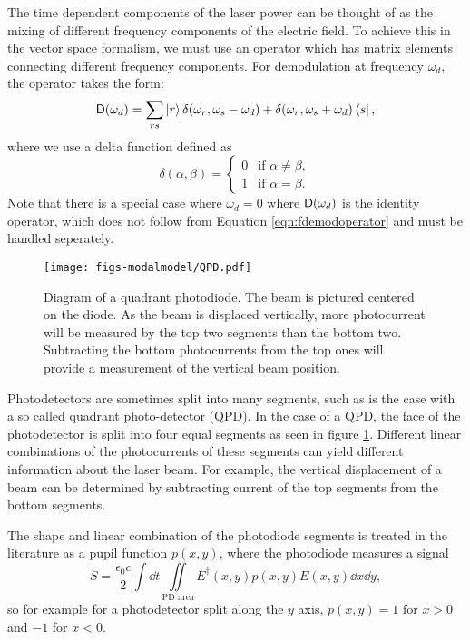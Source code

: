 The time dependent components of the laser power can be thought of as the mixing of different frequency components of the electric field. %
To achieve this in the vector space formalism, we must use an operator which has matrix elements connecting different frequency components. %
For demodulation at frequency $\omega_d$, the  operator takes the form: 
\begin{equation}
\label{eqn:fdemodoperator}
\mathsf{D}(\omega_d) = \sum_{rs} \left| r \right> \delta(\omega_r,\omega_s-\omega_d) + \delta(\omega_r,\omega_s+\omega_d)\left< s \right|,
\end{equation}
where we use a delta function defined as
\begin{equation}
\delta(\alpha,\beta) = 
\begin{cases}
0 & \text{if $\alpha \neq \beta$}, \\
1 & \text{if $\alpha = \beta$}.
\end{cases}
\end{equation}
Note that there is a special case where $\omega_d=0$ where $\mathsf{D}(\omega_d)$ is the identity operator, which does not follow from Equation \ref{eqn:fdemodoperator} and must be handled seperately.
\begin{figure}
  \begin{center}
  \leavevmode
  \texttt{[image: figs-modalmodel/QPD.pdf]}
  \end{center}
  \caption[Diagram of a quadrant photodiode]{Diagram of a quadrant photodiode. The beam is pictured centered on the diode. As the beam is displaced vertically, more photocurrent will be measured by the top two segments than the bottom two. Subtracting the bottom photocurrents from the top ones will provide a measurement of the vertical beam position.}
  \label{fig:QPD}
\end{figure}
Photodetectors are sometimes split into many segments, such as is the case with a so called quadrant photo-detector (QPD). %
In the case of a QPD, the face of the photodetector is split into four equal segments as seen in figure \ref{fig:QPD}. %
Different linear combinations of the photocurrents of these segments can yield different information about the laser beam. %
For example, the vertical displacement of a beam can be determined by subtracting current of the top segments from the bottom segments.

The shape and linear combination of the photodiode segments is treated in the literature\cite{Hefetz:97} as a pupil function $p(x,y)$,  where the photodiode measures a signal
\begin{equation}
S=\frac{\epsilon_0 c}{2}\int \! %
\! %
\dd t \iint\limits_{\text{PD area}}E^\dagger(x,y)p(x,y)E(x,y)\dd x \dd y,
\end{equation}
so for example for a photodetector split along the $y$ axis, $p(x,y)=1$ for $x>0$ and $-1$ for $x<0$.

